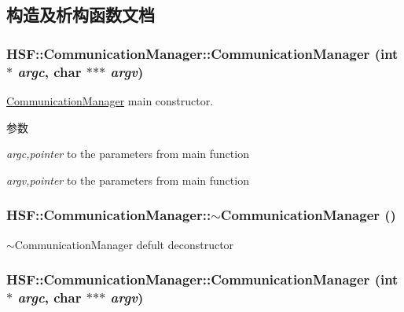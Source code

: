 \subsection{构造及析构函数文档}
\hypertarget{classHSF_1_1CommunicationManager_a2323f6f52600227b24cf9e5419565206}{
\subsubsection[{CommunicationManager}]{\setlength{\rightskip}{0pt plus 5cm}HSF::CommunicationManager::CommunicationManager (int $\ast$ {\em argc}, \/  char $\ast$$\ast$$\ast$ {\em argv})}}
\label{classHSF_1_1CommunicationManager_a2323f6f52600227b24cf9e5419565206}


\hyperlink{classHSF_1_1CommunicationManager}{CommunicationManager} main constructor. 
\begin{DoxyParams}{参数}
\item[{\em argc,pointer}]to the parameters from main function \item[{\em argv,pointer}]to the parameters from main function \end{DoxyParams}
\hypertarget{classHSF_1_1CommunicationManager_ab98fc8b313467c85105bad87a7195cd8}{
\subsubsection[{$\sim$CommunicationManager}]{\setlength{\rightskip}{0pt plus 5cm}HSF::CommunicationManager::$\sim$CommunicationManager ()}}
\label{classHSF_1_1CommunicationManager_ab98fc8b313467c85105bad87a7195cd8}


$\sim$CommunicationManager defult deconstructor \hypertarget{classHSF_1_1CommunicationManager_a2323f6f52600227b24cf9e5419565206}{
\subsubsection[{CommunicationManager}]{\setlength{\rightskip}{0pt plus 5cm}HSF::CommunicationManager::CommunicationManager (int $\ast$ {\em argc}, \/  char $\ast$$\ast$$\ast$ {\em argv})}}
\label{classHSF_1_1CommunicationManager_a2323f6f52600227b24cf9e5419565206}


